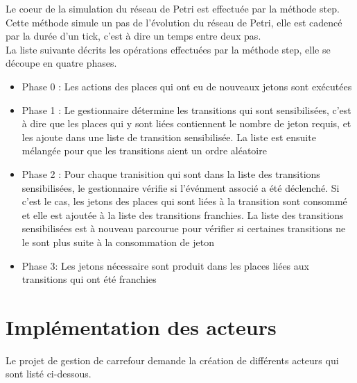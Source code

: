 \documentclass[11pt,a4paper, openany]{memoir}
\begin{document}
Le coeur de la simulation du réseau de Petri est effectuée par la méthode step. Cette méthode simule un pas de  l'évolution du réseau de Petri, elle est cadencé par la durée d'un tick, c'est à dire un temps entre deux pas.\\
La liste suivante décrits les opérations effectuées par la méthode step, elle se découpe en quatre phases.\\
\begin{itemize}
\item Phase 0 : Les actions des places qui ont eu de nouveaux jetons sont exécutées
\item Phase 1 : Le gestionnaire détermine les transitions qui sont sensibilisées, c'est à dire que les places qui y sont liées contiennent le nombre de jeton requis, et les ajoute dans une liste de transition sensibilisée. La liste est ensuite mélangée pour que les transitions aient un ordre aléatoire
\item Phase 2 : Pour chaque tranisition qui sont dans la liste des transitions sensibilisées, le gestionnaire vérifie si l'événment associé a été déclenché. Si c'est le cas, les jetons des places qui sont liées à la transition sont consommé et elle est ajoutée à la liste des transitions franchies. La liste des transitions sensibilisées est à nouveau parcourue pour vérifier si certaines transitions ne le sont plus suite à la consommation de jeton
\item Phase 3: Les jetons nécessaire sont produit dans les places liées aux transitions qui ont été franchies
\end{itemize}

\chapter{Implémentation des acteurs}

Le projet de gestion de carrefour demande la création de différents acteurs qui sont listé ci-dessous.\\
\end{document}
